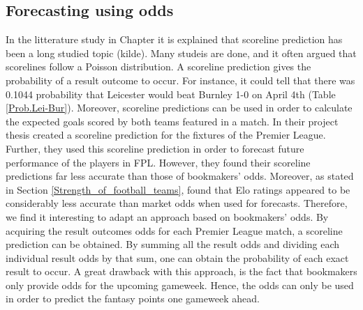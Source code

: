 \subsection{Forecasting using odds}
In the litterature study in Chapter it is explained that scoreline prediction has been a long studied topic (kilde). Many studeis are done, and it often argued that scorelines follow a Poisson distribution. A scoreline prediction gives the probability of a result outcome to occur. For instance, it could tell that there was 0.1044 probability that Leicester would beat Burnley 1-0 on April 4th (Table \ref{Prob.Lei-Bur}). Moreover, scoreline predictions can be used in order to calculate the expected goals scored by both teams featured in a match. In their project thesis \cite{Gupta} created a scoreline prediction for the fixtures of the Premier League. Further, they used this scoreline prediction in order to forecast future performance of the players in FPL. However, they found their scoreline predictions far less accurate than those of bookmakers' odds. Moreover, as stated in Section \ref{Strength_of_football_teams}, \cite{Hvattum} found that Elo ratings appeared to be considerably less accurate than market odds when used for forecasts. Therefore, we find it interesting to adapt an approach based on bookmakers' odds. By acquiring the result outcomes odds for each Premier League match, a scoreline prediction can be obtained. By summing all the result odds and dividing each individual result odds by that sum, one can obtain the probability of each exact result to occur. A great drawback with this approach, is the fact that bookmakers only provide odds for the upcoming gameweek. Hence, the odds can only be used in order to predict the fantasy points one gameweek ahead.  

\newpar

\begin{comment}
It is reasonable to assume that bookmakers provide a realistic odds distribution for the different scorelines, in order to avoid profitable gambling.


\textit{Få med avsnitt om hvordan hva som ligger bak scoreline prediction og expected goals, referer til Maher etc.}

\subsubsection{Scoreline Prediction}

In order obtain predication of a scoreline, 

\subsubsection{Expected goals}
\end{comment}
\newpar



